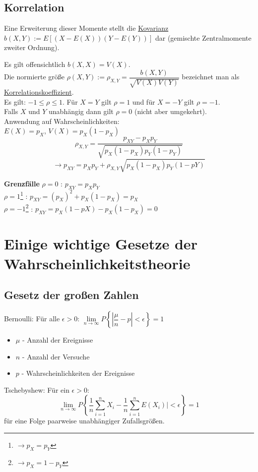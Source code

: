 \documentclass[10pt]{report}
\theoremstyle{definition}
\begin{document}
\subsection{Korrelation}
Eine Erweiterung dieser Momente stellt die \underline{Kovarianz}
$b(X,Y) := E\left[\left(X-E(X)\right) \left( Y-E(Y) \right)\right]$
dar (gemischte Zentralmomente zweiter Ordnung).

Es gilt offensichtlich $b(X,X) = V(X)$.\\
Die normierte größe $\rho(X,Y) := \rho_{X,Y} = \dfrac{b(X,Y)}{\sqrt{V(X)V(Y)}}$ bezeichnet man als \underline{Korrelationskoeffizient}. \\
Es gilt: $-1 \leq \rho \leq 1$. Für $X=Y$ gilt $\rho = 1$ und für $X=-Y$ gilt $\rho = -1$. \\
Falls $X$ und $Y$ unabhängig dann gilt $\rho = 0$ (nicht aber umgekehrt).\\
Anwendung auf Wahrscheinlichkeiten: \\
$E(X) = p_X$, $V(X) = p_X(1 - p_X)$ \\

\[\rho_{X,Y} = \dfrac{p_{XY} - p_Xp_Y}{\sqrt{p_X(1-p_X) p_Y(1-p_Y)}}\]
\[ \rightarrow p_{XY} = p_Xp_Y + \rho_{X,Y} \sqrt{p_X(1-p_X)p_Y(1-pY)}\]

\textbf{Grenzfälle} 
$\rho = 0$ : $p_{XY} = p_X p_Y$\\
$\rho = 1$\footnote{$\rightarrow p_X = p_Y$} : $p_{XY} = (p_X)^2 + p_X(1-p_X) = p_X$\\
$\rho = -1$\footnote{$\rightarrow p_X = 1 - p_Y$} : $p_{XY} = p_X(1-pX) - p_X(1-p_X) = 0 $\\

\section{Einige wichtige Gesetze der Wahrscheinlichkeitstheorie}

\subsection{Gesetz der großen Zahlen}
Bernoulli: Für alle $\epsilon > 0$: $\lim\limits_{n \rightarrow \infty}{P \left\lbrace| \dfrac{\mu}{n} - p | < \epsilon \right\rbrace} = 1$
\begin{itemize}
	\item $\mu$ - Anzahl der Ereignisse
	\item $n$ - Anzahl der Versuche
	\item $p$ - Wahrscheinlichkeiten der Ereignisse
\end{itemize}
Tschebyshew: Für ein $\epsilon >0$:
\[\lim\limits_{n \to \infty} P \left\{\frac{1}{n} \sum_{i=1}^{n} X_i - \frac{1}{n} \sum_{i=1}^{n} E(X_i)| < \epsilon \right\} = 1\] für eine Folge paarweise unabhängiger Zufallsgrößen.\\
\end{document}
